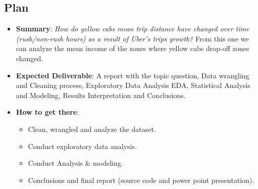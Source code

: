 \documentclass[11pt]{article}
\begin{document}
\subsection{Plan}
\begin{itemize}
\item \textbf{Summary}: \textit{How do yellow cabs mean trip distance have changed over time (rush/non-rush hours) as a result of Uber's trips growth?}  From this one we can analyze the mean income of the zones where yellow cabs drop-off zones changed.


\item \textbf{Expected Deliverable}: A report with the topic question, Data wrangling and Cleaning process, Exploratory Data Analysis EDA, Statistical Analysis and Modeling, Results Interpretation and Conclusions.

\item \textbf{How to get there}: 
\begin{itemize}
\item Clean, wrangled and analyze the dataset.
\item Conduct exploratory data analysis.
\item Conduct Analysis \& modeling.
\item Conclusions and final report (source code and power point presentation).
\end{itemize}

\end{itemize}




%
%
\end{document}
